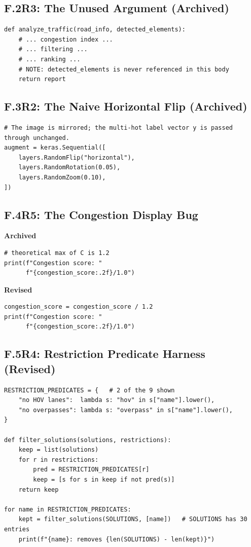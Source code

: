 \documentclass[11pt]{article}
\begin{document}
\subsection*{F.2\quad R3: The Unused Argument (Archived)}
\begin{verbatim}
def analyze_traffic(road_info, detected_elements):
    # ... congestion index ...
    # ... filtering ...
    # ... ranking ...
    # NOTE: detected_elements is never referenced in this body
    return report
\end{verbatim}

\subsection*{F.3\quad R2: The Naive Horizontal Flip (Archived)}
\begin{verbatim}
# The image is mirrored; the multi-hot label vector y is passed through unchanged.
augment = keras.Sequential([
    layers.RandomFlip("horizontal"),
    layers.RandomRotation(0.05),
    layers.RandomZoom(0.10),
])
\end{verbatim}

\subsection*{F.4\quad R5: The Congestion Display Bug}
\noindent
\begin{minipage}[t]{0.49\textwidth}
\textbf{Archived}
\scriptsize
\begin{verbatim}
# theoretical max of C is 1.2
print(f"Congestion score: "
      f"{congestion_score:.2f}/1.0")
\end{verbatim}
\end{minipage}\hfill
\begin{minipage}[t]{0.49\textwidth}
\textbf{Revised}
\scriptsize
\begin{verbatim}
congestion_score = congestion_score / 1.2
print(f"Congestion score: "
      f"{congestion_score:.2f}/1.0")
\end{verbatim}
\end{minipage}

\subsection*{F.5\quad R4: Restriction Predicate Harness (Revised)}
\begin{verbatim}
RESTRICTION_PREDICATES = {   # 2 of the 9 shown
    "no HOV lanes":  lambda s: "hov" in s["name"].lower(),
    "no overpasses": lambda s: "overpass" in s["name"].lower(),
}

def filter_solutions(solutions, restrictions):
    keep = list(solutions)
    for r in restrictions:
        pred = RESTRICTION_PREDICATES[r]
        keep = [s for s in keep if not pred(s)]
    return keep

for name in RESTRICTION_PREDICATES:
    kept = filter_solutions(SOLUTIONS, [name])   # SOLUTIONS has 30 entries
    print(f"{name}: removes {len(SOLUTIONS) - len(kept)}")
\end{verbatim}
\end{document}
